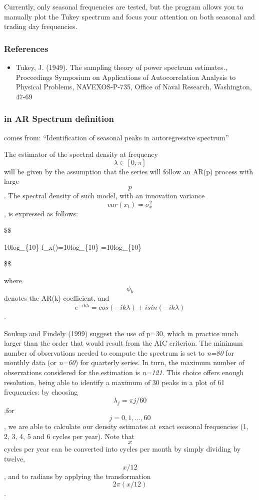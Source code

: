 \documentclass[
  letterpaper,
  DIV=11,
  numbers=noendperiod]{scrreprt}
\providecommand{\tightlist}{%
  \setlength{\itemsep}{0pt}\setlength{\parskip}{0pt}}\usepackage{longtable,booktabs,array}
\begin{document}
Currently, only seasonal frequencies are tested, but the program allows
you to manually plot the Tukey spectrum and focus your attention on both
seasonal and trading day frequencies.

\hypertarget{references-1}{%
\subsubsection{References}\label{references-1}}

\begin{itemize}
\tightlist
\item
  Tukey, J. (1949). The sampling theory of power spectrum estimates.,
  Proceedings Symposium on Applications of Autocorrelation Analysis to
  Physical Problems, NAVEXOS-P-735, Office of Naval Research,
  Washington, 47-69
\end{itemize}

\hypertarget{in-ar-spectrum-definition}{%
\subsubsection{in AR Spectrum
definition}\label{in-ar-spectrum-definition}}

comes from: ``Identification of seasonal peaks in autoregressive
spectrum''

The estimator of the spectral density at frequency
\[\lambda \in [0,\pi]\] will be given by the assumption that the series
will follow an AR(p) process with large \[p\]. The spectral density of
such model, with an innovation variance \[ var(x_{t})=\sigma^2_x \], is
expressed as follows:

\$\$

10\times log\_\{10\} f\_x(\lambda)=10\times log\_\{10\}
=10\times log\_\{10\}

\$\$

where \[ \phi_k \] denotes the AR(k) coefficient, and
\[ e^{-ik\lambda}=cos⁡(-ik\lambda)+i sin⁡(-ik\lambda)\].

Soukup and Findely (1999) suggest the use of p=30, which in practice
much larger than the order that would result from the AIC criterion. The
minimum number of observations needed to compute the spectrum is set to
\emph{n=80} for monthly data (or \emph{n=60}) for quarterly series. In
turn, the maximum number of observations considered for the estimation
is \emph{n=121}. This choice offers enough resolution, being able to
identify a maximum of 30 peaks in a plot of 61 frequencies: by choosing
\[ \lambda_j=\pi j/60 \],for \[ j=0,1,…,60 \], we are able to calculate
our density estimates at exact seasonal frequencies (1, 2, 3, 4, 5 and 6
cycles per year). Note that \[x\] cycles per year can be converted into
cycles per month by simply dividing by twelve, \[x/12\], and to radians
by applying the transformation \[2\pi(x/12)\].
\end{document}
